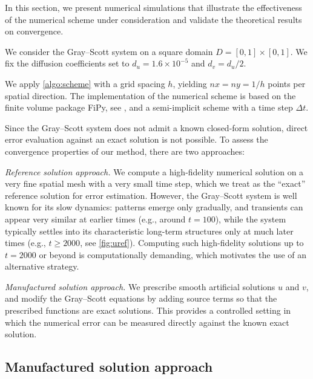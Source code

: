 \documentclass[11pt, a4paper]{amsart}
\numberwithin{equation}{section}
\begin{document}
	In this section, we present numerical simulations that illustrate the effectiveness of the numerical scheme under consideration and validate the theoretical results on convergence.
	
	We consider the Gray--Scott system on a square domain $D = [0, 1]\times [0, 1]$. We fix the diffusion coefficients set to $d_u = 1.6\times 10^{-5}$ and $d_v = d_u/2$. 
	
	We apply \cref{algo:scheme} with a grid spacing $h$, yielding $nx = ny = 1/h$ points per spatial direction. The implementation of the numerical scheme is based on the finite volume package FiPy, see \cite{fipy}, and a semi-implicit scheme with a time step $\Delta t$.
	
	Since the Gray--Scott system does not admit a known closed-form solution, direct error evaluation against an exact solution is not possible. To assess the convergence properties of our method, there are two approaches:
	
	\textit{Reference solution approach.} We compute a high-fidelity numerical solution on a very fine spatial mesh with a very small time step, which we treat as the ``exact'' reference solution for error estimation. However, the Gray--Scott system is well known for its slow dynamics: patterns emerge only gradually, and transients can appear very similar at earlier times (e.g., around $t=100$), while the system typically settles into its characteristic long-term structures only at much later times (e.g., $t \geq 2000$, see \cref{fig:uref}). Computing such high-fidelity solutions up to $t=2000$ or beyond is computationally demanding, which motivates the use of an alternative strategy.
	
	\textit{Manufactured solution approach.} We prescribe smooth artificial solutions $u$ and $v$, and modify the Gray--Scott equations by adding source terms so that the prescribed functions are exact solutions. This provides a controlled setting in which the numerical error can be measured directly against the known exact solution.


	 
	
	
	\subsection{Manufactured solution approach}\label{subsec:manufactured_solution}
	
\end{document}
